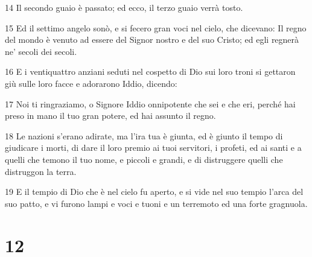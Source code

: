 \par 14 Il secondo guaio è passato; ed ecco, il terzo guaio verrà tosto.
\par 15 Ed il settimo angelo sonò, e si fecero gran voci nel cielo, che dicevano: Il regno del mondo è venuto ad essere del Signor nostro e del suo Cristo; ed egli regnerà ne' secoli dei secoli.
\par 16 E i ventiquattro anziani seduti nel cospetto di Dio sui loro troni si gettaron giù sulle loro facce e adorarono Iddio, dicendo:
\par 17 Noi ti ringraziamo, o Signore Iddio onnipotente che sei e che eri, perché hai preso in mano il tuo gran potere, ed hai assunto il regno.
\par 18 Le nazioni s'erano adirate, ma l'ira tua è giunta, ed è giunto il tempo di giudicare i morti, di dare il loro premio ai tuoi servitori, i profeti, ed ai santi e a quelli che temono il tuo nome, e piccoli e grandi, e di distruggere quelli che distruggon la terra.
\par 19 E il tempio di Dio che è nel cielo fu aperto, e si vide nel suo tempio l'arca del suo patto, e vi furono lampi e voci e tuoni e un terremoto ed una forte gragnuola.

\chapter{12}

